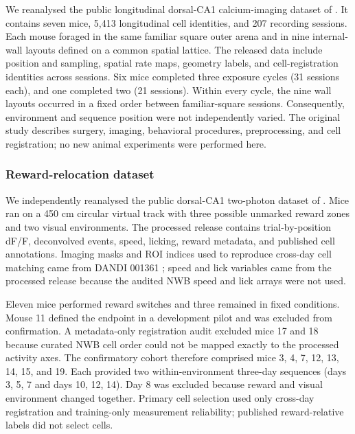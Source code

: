 \documentclass[10pt,twocolumn]{article}
\begin{document}
We reanalysed the public longitudinal dorsal-CA1 calcium-imaging dataset of
\citet{LeeEtAl2025,LeeKeinathBrandon2024Dataset}. It contains seven mice, 5,413
longitudinal cell identities, and 207 recording sessions. Each mouse foraged in
the same familiar square outer arena and in nine internal-wall layouts defined
on a common spatial lattice. The released data include position and sampling,
spatial rate maps, geometry labels, and cell-registration identities across
sessions. Six mice completed three exposure cycles (31 sessions each), and one
completed two (21 sessions). Within every cycle, the nine wall layouts occurred
in a fixed order between familiar-square sessions. Consequently, environment
and sequence position were not independently varied. The original study
describes surgery, imaging, behavioral procedures, preprocessing, and cell
registration; no new animal experiments were performed here.

\subsubsection{Reward-relocation dataset}

We independently reanalysed the public dorsal-CA1 two-photon dataset of
\citet{SosaEtAl2025,SosaEtAl2025Dataset}. Mice ran on a 450 cm circular virtual
track with three possible unmarked reward zones and two visual environments.
The processed release contains trial-by-position dF/F, deconvolved events,
speed, licking, reward metadata, and published cell annotations. Imaging masks
and ROI indices used to reproduce cross-day cell matching came from DANDI
001361 \citep{SosaEtAl2025DANDI}; speed and lick variables came from the
processed release because the audited NWB speed and lick arrays were not used.

Eleven mice performed reward switches and three remained in fixed conditions.
Mouse 11 defined the endpoint in a development pilot and was excluded from
confirmation. A metadata-only registration audit excluded mice 17 and 18
because curated NWB cell order could not be mapped exactly to the processed
activity axes. The confirmatory cohort therefore comprised mice 3, 4, 7, 12,
13, 14, 15, and 19. Each provided two within-environment three-day sequences
(days 3, 5, 7 and days 10, 12, 14). Day 8 was excluded because reward and
visual environment changed together. Primary cell selection used only
cross-day registration and training-only measurement reliability; published
reward-relative labels did not select cells.
\end{document}
